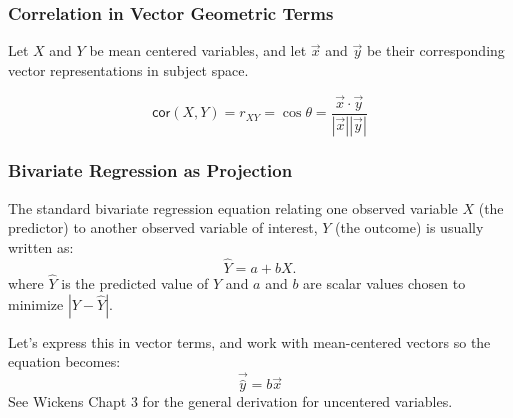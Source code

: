 \documentclass{beamer}
\begin{document}
\begin{frame}
  \frametitle{Correlation in Vector Geometric Terms}
  
Let $X$ and $Y$ be mean centered variables, and let $\vec{x}$ and $\vec{y}$ be their corresponding vector representations in subject space.

\begin{center}

\end{center}

\[
\mathsf{cor}(X,Y) = r_{XY} = \cos \theta = \frac{\vec{x} \cdot \vec{y}}{|\vec{x}||\vec{y}|}
\]


\end{frame}


\begin{frame}
  \frametitle{Bivariate Regression as Projection}
  
The standard bivariate regression equation relating one observed variable $X$ (the predictor) to another observed variable of interest, $Y$ (the outcome) is usually written as:
\[
\widehat{Y} = a + bX.
\]
where $\widehat{Y}$ is the predicted value of $Y$ and $a$ and $b$ are scalar values chosen to minimize $|Y-\widehat{Y}|$.

\medskip

Let's express this in vector terms, and work with mean-centered vectors so the equation becomes:
\[
\vec{\widehat{y}} = b\vec{x}
\]
See Wickens Chapt 3 for the general derivation for uncentered variables.

\end{frame}
\end{document}
